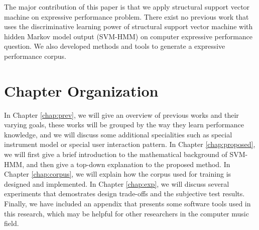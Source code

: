 The major contribution of this paper is that we apply structural support vector machine on expressive performance problem. There exist no previous work that uses the discriminative learning power of structural support vector machine with hidden Markov model output (SVM-HMM) on computer expressive performance question. We also developed methods and tools to generate a expressive performance corpus.
%
%
\section{Chapter Organization}
In Chapter \ref{chap:prev}, we will give an overview of previous works and their varying goals, these works will be grouped by the way they learn performance knowledge, and we will discuss some additional specialities such as special instrument model or special user interaction pattern. In Chapter \ref{chap:proposed}, we will first give a brief introduction to the mathematical background of SVM-HMM, and then give a top-down explanation to the proposed method. In Chapter \ref{chap:corpus}, we will explain how the corpus used for training is designed and implemented. In Chapter \ref{chap:exp}, we will discuss several experiments that demostrates design trade-offs and the subjective test results. Finally, we have included an appendix that presents some software tools used in this research, which may be helpful for other researchers in the computer music field.
